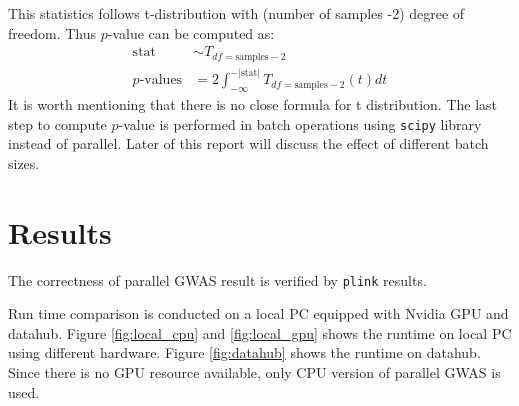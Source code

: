 \documentclass{article}
\begin{document}
This statistics follows t-distribution with (number of samples -2) degree of freedom.
Thus $p$-value can be computed as:
$$
\begin{aligned}\text{stat} &\sim T_{df=\text{samples} -2}\\ p\text{-values} &=2\int^{-|\text{stat} |}_{-\infty } T_{df=\text{samples} -2}(t)dt\end{aligned}
$$
It is worth mentioning that there is no close formula for t distribution.
The last step to compute $p$-value is performed in batch operations 
using \texttt{scipy} library instead of parallel. 
Later of this report will discuss the effect of different batch sizes.

\section{Results}
The correctness of parallel GWAS result is verified by \texttt{plink} results.

Run time comparison is conducted on a local PC equipped with Nvidia GPU and datahub.
Figure \ref*{fig:local_cpu} and \ref*{fig:local_gpu} shows the runtime 
on local PC using different hardware.
Figure \ref*{fig:datahub} shows the runtime on datahub. 
Since there is no GPU resource available, only CPU version of parallel GWAS is used.
\end{document}
